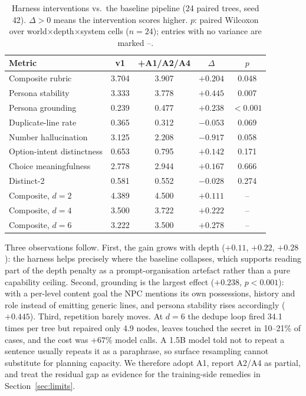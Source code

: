 \documentclass[conference]{IEEEtran}
\begin{document}
\begin{table}[t]\centering\small
\caption{Harness interventions vs.\ the baseline pipeline (24 paired trees, seed 42). $\Delta>0$ means
the intervention scores higher. $p$: paired Wilcoxon over world$\times$depth$\times$system cells
($n=24$); entries with no variance are marked --.}
\label{tab:interventions}
\begin{tabular}{lcccc}
\toprule
Metric & v1 & +A1/A2/A4 & $\Delta$ & $p$\\
\midrule
Composite rubric & 3.704 & 3.907 & $+0.204$ & 0.048\\
Persona stability & 3.333 & 3.778 & $+0.445$ & 0.007\\
Persona grounding & 0.239 & 0.477 & $+0.238$ & $<0.001$\\
Duplicate-line rate & 0.365 & 0.312 & $-0.053$ & 0.069\\
Number hallucination & 3.125 & 2.208 & $-0.917$ & 0.058\\
Option-intent distinctness & 0.653 & 0.795 & $+0.142$ & 0.171\\
Choice meaningfulness & 2.778 & 2.944 & $+0.167$ & 0.666\\
Distinct-2 & 0.581 & 0.552 & $-0.028$ & 0.274\\
\midrule
Composite, $d=2$ & 4.389 & 4.500 & $+0.111$ & --\\
Composite, $d=4$ & 3.500 & 3.722 & $+0.222$ & --\\
Composite, $d=6$ & 3.222 & 3.500 & $+0.278$ & --\\
\bottomrule
\end{tabular}
\end{table}

Three observations follow. First, the gain grows with depth ($+0.11$, $+0.22$, $+0.28$): the harness
helps precisely where the baseline collapses, which supports reading part of the depth penalty as a
prompt-organisation artefact rather than a pure capability ceiling. Second, grounding is the largest
effect ($+0.238$, $p<0.001$): with a per-level content goal the NPC mentions its own possessions,
history and role instead of emitting generic lines, and persona stability rises accordingly
($+0.445$). Third, repetition barely moves. At $d=6$ the dedupe loop fired 34.1 times per tree but
repaired only 4.9 nodes, leaves touched the secret in 10--21\% of cases, and the cost was $+67\%$
model calls. A 1.5B model told not to repeat a sentence usually repeats it as a paraphrase, so surface
resampling cannot substitute for planning capacity. We therefore adopt A1, report A2/A4 as partial,
and treat the residual gap as evidence for the training-side remedies in
Section~\ref{sec:limits}.
\end{document}
